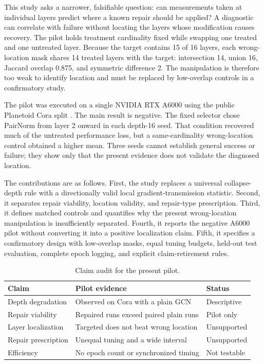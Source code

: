 \documentclass[journal]{IEEEtran}
\begin{document}
This study asks a narrower, falsifiable question: can measurements taken at individual layers predict where a known repair should be applied? A diagnostic can correlate with failure without locating the layers whose modification causes recovery. The pilot holds treatment cardinality fixed while swapping one treated and one untreated layer. Because the target contains 15 of 16 layers, each wrong-location mask shares 14 treated layers with the target: intersection 14, union 16, Jaccard overlap 0.875, and symmetric difference 2. The manipulation is therefore too weak to identify location and must be replaced by low-overlap controls in a confirmatory study.

The pilot was executed on a single NVIDIA RTX A6000 using the public Planetoid Cora split \cite{yang2016planetoid}. The main result is negative. The fixed selector chose PairNorm from layer 2 onward in each depth-16 seed. That condition recovered much of the untreated performance loss, but a same-cardinality wrong-location control obtained a higher mean. Three seeds cannot establish general success or failure; they show only that the present evidence does not validate the diagnosed location.

The contributions are as follows. First, the study replaces a universal collapse-depth rule with a directionally valid local gradient-transmission statistic. Second, it separates repair viability, location validity, and repair-type prescription. Third, it defines matched controls and quantifies why the present wrong-location manipulation is insufficiently separated. Fourth, it reports the negative A6000 pilot without converting it into a positive localization claim. Fifth, it specifies a confirmatory design with low-overlap masks, equal tuning budgets, held-out test evaluation, complete epoch logging, and explicit claim-retirement rules.

\begin{table}[t]
\caption{Claim audit for the present pilot.}
\label{tab:claim-audit}
\centering
\footnotesize
\setlength{\tabcolsep}{2pt}
\begin{tabular}{p{}p{}p{}}
\toprule
Claim & Pilot evidence & Status \\
\midrule
Depth degradation & Observed on Cora with a plain GCN & Descriptive \\
Repair viability & Repaired runs exceed paired plain runs & Pilot only \\
Layer localization & Targeted does not beat wrong location & Unsupported \\
Repair prescription & Unequal tuning and a wide interval & Unsupported \\
Efficiency & No epoch count or synchronized timing & Not testable \\
\bottomrule
\end{tabular}
\end{table}
\end{document}
